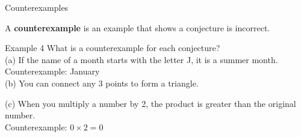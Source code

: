\documentclass[t]{beamer}
\begin{document}
\begin{frame}{Counterexamples}
\begin{tcolorbox}[colframe=green!20!black, colback = green!30!white,title=\textbf{Counterexamples}]
A \textbf{counterexample} is an example that shows a conjecture is incorrect.
\end{tcolorbox}
\end{frame}

\begin{frame}{Example 4}
What is a counterexample for each conjecture?	\newline\\
(a)	\quad	If the name of a month starts with the letter J, it is a summer month.	\pause	\newline\\ Counterexample: January	\newline\\
(b)	\quad	You can connect any 3 points to form a triangle.	\newline\\	\pause
\begin{center}
\end{center}
\pause
(c)	\quad	When you multiply a number by 2, the product is greater than the original number.	\newline\\	\pause
Counterexample: $0 \times 2 = 0$
\end{frame}
\end{document}
